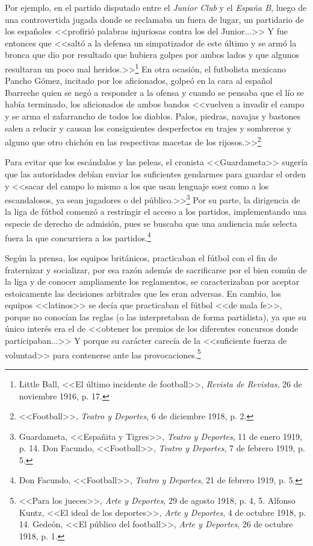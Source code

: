 \documentclass[11pt,a5paper,twoside]{book} %
\begin{document}
Por ejemplo, en el partido disputado entre el \emph{Junior Club} y el \emph{España B}, luego de una controvertida jugada donde se reclamaba un fuera de lugar, un partidario de los españoles <<profirió palabras injuriosas contra los del Junior...>> Y fue entonces que <<saltó a la defensa un simpatizador de este último y se armó la bronca que dio por resultado que hubiera golpes por ambos lados y que algunos resultaran un poco mal heridos.>>\footnote{Little Ball, <<El último incidente de football>>, \emph{Revista de Revistas}, 26 de noviembre 1916, p. 17.} En otra ocasión, el futbolista mexicano Pancho Gómez, incitado por los aficionados, golpeó en la cara al español Ibarreche quien se negó a responder a la ofensa y cuando se pensaba que el lío se había terminado, los aficionados de ambos bandos <<vuelven a invadir el campo y se arma el zafarrancho de todos los diablos. Palos, piedras, navajas y bastones salen a relucir y causan los consiguientes desperfectos en trajes y sombreros y alguno que otro chichón en las respectivas macetas de los rijosos.>>\footnote{<<Football>>, \emph{Teatro y Deportes}, 6 de diciembre 1918, p. 2.}

Para evitar que los escándalos y las peleas, el cronista <<Guardameta>> sugería que las autoridades debían enviar los suficientes gendarmes para guardar el orden y <<sacar del campo lo mismo a los que usan lenguaje soez como a los escandalosos, ya sean jugadores o del público.>>\footnote{Guardameta, <<Españita y Tigres>>, \emph{Teatro y Deportes}, 11 de enero 1919, p. 14. Don Facundo, <<Football>>, \emph{Teatro y Deportes}, 7 de febrero 1919, p. 5.} Por su parte, la dirigencia de la liga de fútbol comenzó a restringir el acceso a los partidos, implementando una especie de derecho de admisión, pues se buscaba que una audiencia más selecta fuera la que concurriera a los partidos.\footnote{Don Facundo, <<Football>>, \emph{Teatro y Deportes}, 21 de febrero 1919, p. 5.}

Según la prensa, los equipos británicos, practicaban el fútbol con el fin de fraternizar y socializar, por esa razón además de sacrificarse por el bien común de la liga y de conocer ampliamente los reglamentos, se caracterizaban por aceptar estoicamente las decisiones arbitrales que les eran adversas. En cambio, los equipos <<latinos>> se decía que practicaban el fútbol <<de mala fe>>, porque no conocían las reglas (o las interpretaban de forma partidista), ya que su único interés era el de <<obtener los premios de los diferentes concursos donde participaban...>> Y porque su carácter carecía de la <<suficiente fuerza de voluntad>> para contenerse ante las provocaciones.\footnote{<<Para los jueces>>, \emph{Arte y Deportes}, 29 de agosto 1918, p. 4, 5. Alfonso Kuntz, <<El ideal de los deportes>>, \emph{Arte y Deportes}, 4 de octubre 1918, p. 14. Gedeón, <<El público del football>>, \emph{Arte y Deportes}, 26 de octubre 1918, p. 1.}
\end{document}
